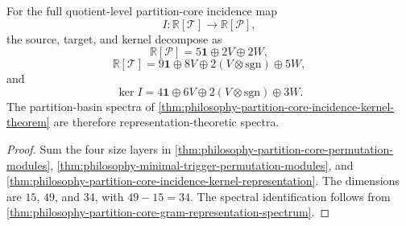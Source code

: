 \begin{theorem}
\label{thm:philosophy-representation-theoretic-incidence-theorem}
For the full quotient-level partition-core incidence map
$$
  I:\mathbb{R}[\mathcal{T}]\to\mathbb{R}[\mathcal{P}],
$$
the source, target, and kernel decompose as
$$
  \mathbb{R}[\mathcal{P}]
  =
  5\mathbf{1}\oplus2V\oplus2W,
$$
$$
  \mathbb{R}[\mathcal{T}]
  =
  9\mathbf{1}\oplus8V\oplus2(V\otimes\mathrm{sgn})\oplus5W,
$$
and
$$
  \ker I
  =
  4\mathbf{1}\oplus6V\oplus2(V\otimes\mathrm{sgn})\oplus3W.
$$
The partition-basin spectra of
\autoref{thm:philosophy-partition-core-incidence-kernel-theorem} are
therefore representation-theoretic spectra.
\end{theorem}
\begin{proof}
Sum the four size layers in
\autoref{thm:philosophy-partition-core-permutation-modules},
\autoref{thm:philosophy-minimal-trigger-permutation-modules}, and
\autoref{thm:philosophy-partition-core-incidence-kernel-representation}.
The dimensions are $15$, $49$, and $34$, with $49-15=34$. The spectral
identification follows from
\autoref{thm:philosophy-partition-core-gram-representation-spectrum}.
\end{proof}

